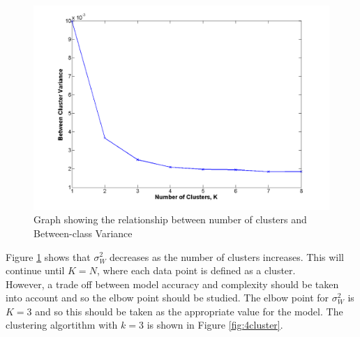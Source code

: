 \begin{figure}[!ht]
\centering
\includegraphics[width=1.0\textwidth]{Images/Sw2graph.png}
\caption{\label{fig:elbow} Graph showing the relationship between number of clusters and Between-class Variance  }
\end{figure}









\noindent Figure \ref{fig:elbow} shows that $\sigma^2_{W}$ decreases as the number of clusters increases. This will continue until $K = N$, where each data point is defined as a cluster.\\

\noindent However, a trade off between model accuracy and complexity should be taken into account and so the elbow point should be studied. The elbow point for $\sigma^2_{W}$ is $K = 3$ and so this should be taken as the appropriate value for the model. The clustering algortithm with $k  =3$ is shown in Figure \ref{fig:4cluster}.



